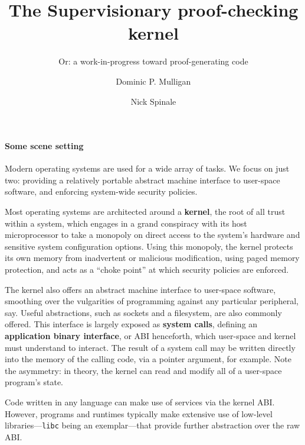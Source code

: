 \documentclass[sigplan, review]{acmart}
\title{The Supervisionary proof-checking kernel}
\subtitle{Or: a work-in-progress toward proof-generating code}
\author{Dominic P. Mulligan}
\affiliation{
  \institution{Systems Research Group, Arm Research}
  \streetaddress{Fulbourn Road}
  \city{Cambridge}
  \country{United Kingdom}
}
\author{Nick Spinale}
\affiliation{
  \institution{Systems Research Group, Arm Research}
  \streetaddress{Fulbourn Road}
  \city{Cambridge}
  \country{United Kingdom}
}
\newcommand{\deffont}[1]{\textbf{#1}}
\begin{document}
\maketitle

\paragraph{Some scene setting}

Modern operating systems are used for a wide array of tasks.
We focus on just two: providing a relatively portable abstract machine interface to user-space software, and enforcing system-wide security policies.

Most operating systems are architected around a \deffont{kernel}, the root of all trust within a system, which engages in a grand conspiracy with its host microprocessor to take a monopoly on direct access to the system's hardware and sensitive system configuration options.
Using this monopoly, the kernel protects its own memory from inadvertent or malicious modification, using paged memory protection, and acts as a ``choke point'' at which security policies are enforced.


The kernel also offers an abstract machine interface to user-space software, smoothing over the vulgarities of programming against any particular peripheral, say.
Useful abstractions, such as sockets and a filesystem, are also commonly offered.
This interface is largely exposed as \deffont{system calls}, defining an \deffont{application binary interface}, or ABI henceforth, which user-space and kernel must understand to interact.
The result of a system call may be written directly into the memory of the calling code, via a pointer argument, for example.
Note the asymmetry: in theory, the kernel can read and modify all of a user-space program's state.

Code written in any language can make use of services via the kernel ABI.
However, programs and runtimes typically make extensive use of low-level libraries---\texttt{libc} being an exemplar---that provide further abstraction over the raw ABI.
\end{document}
